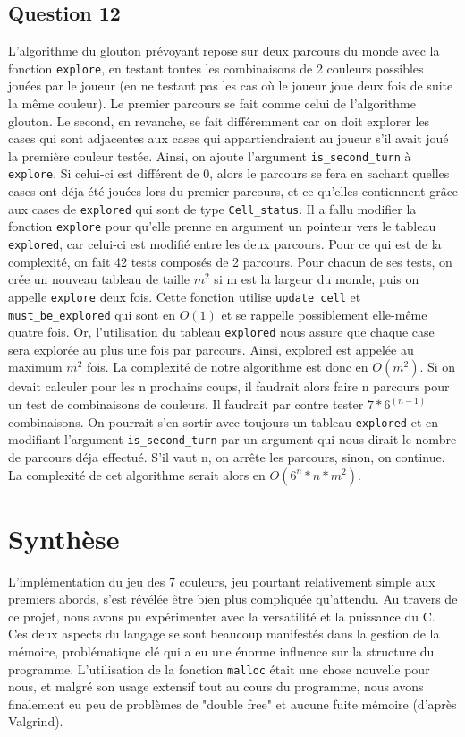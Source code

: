 \documentclass{article}
\begin{document}
\subsection{Question 12}
    L'algorithme du glouton prévoyant repose sur deux parcours du monde avec la fonction \texttt{explore}, en testant toutes les combinaisons de 2 couleurs possibles jouées par le joueur (en ne testant pas les cas où le joueur joue deux fois de suite la même couleur). Le premier parcours se fait comme celui de l'algorithme glouton. Le second, en revanche, se fait différemment car on doit explorer les cases qui sont adjacentes aux cases qui appartiendraient au joueur s'il avait joué la première couleur testée. Ainsi, on ajoute l'argument \texttt{is\_second\_turn} à \texttt{explore}. Si celui-ci est différent de 0, alors le parcours se fera en sachant quelles cases ont déja été jouées lors du premier parcours, et ce qu'elles contiennent grâce aux cases de \texttt{explored} qui sont de type \texttt{Cell\_status}. Il a fallu modifier la fonction \texttt{explore} pour qu'elle prenne en argument un pointeur vers le tableau \texttt{explored}, car celui-ci est modifié entre les deux parcours. 
    Pour ce qui est de la complexité, on fait 42 tests composés de 2 parcours. Pour chacun de ses tests, on crée un nouveau tableau de taille $m^2$ si m est la largeur du monde, puis on appelle \texttt{explore} deux fois. Cette fonction utilise \texttt{update\_cell} et \texttt{must\_be\_explored} qui sont en $O(1)$ et se rappelle possiblement elle-même quatre fois. Or, l'utilisation du tableau \texttt{explored} nous assure que chaque case sera explorée au plus une fois par parcours. Ainsi, explored est appelée au maximum $m^2$ fois. La complexité de notre algorithme est donc en $O(m^2)$. Si on devait calculer pour les n prochains coups, il faudrait alors faire n parcours pour un test de combinaisons de couleurs. Il faudrait par contre tester $7*6^{(n-1)}$ combinaisons. On pourrait s'en sortir avec toujours un tableau \texttt{explored} et en modifiant l'argument \texttt{is\_second\_turn} par un argument qui nous dirait le nombre de parcours déja effectué. S'il vaut n, on arrête les parcours, sinon, on continue. La complexité de cet algorithme serait alors en $O({6^n}*n*m^2)$.
\section{Synthèse}
	L'implémentation du jeu des 7 couleurs, jeu pourtant relativement simple aux premiers abords, s'est révélée être bien plus compliquée qu'attendu. Au travers de ce projet, nous avons pu expérimenter avec la versatilité et la puissance du C. Ces deux aspects du langage se sont beaucoup manifestés dans la gestion de la mémoire, problématique clé qui a eu une énorme influence sur la structure du programme. L'utilisation de la fonction \texttt{malloc} était une chose nouvelle pour nous, et malgré son usage extensif tout au cours du programme, nous avons finalement eu peu de problèmes de "double free" et aucune fuite mémoire (d'après Valgrind).
	
\end{document}
